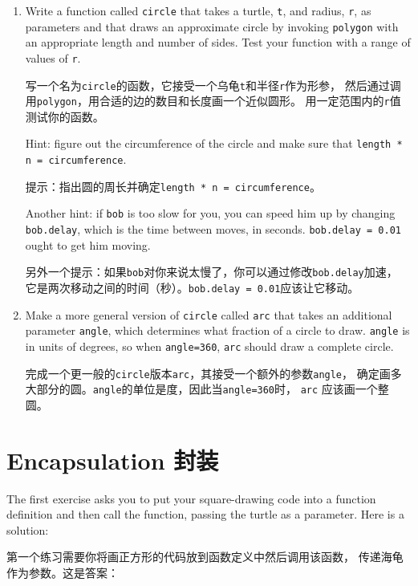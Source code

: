 \documentclass[10pt]{book}
\begin{document}
\begin{CJK}{UTF8}{gbsn}
\begin{enumerate}
\item Write a function called {\tt circle} that takes a turtle, {\tt t},
and radius, {\tt r}, as parameters and that draws an approximate circle
by invoking {\tt polygon} with an appropriate length and number of
sides.  Test your function with a range of values of {\tt r}.

写一个名为{\tt circle}的函数，它接受一个乌龟{\tt t}和半径{\tt r}作为形参，
然后通过调用{\tt polygon}，用合适的边的数目和长度画一个近似圆形。
用一定范围内的{\tt r}值测试你的函数。

Hint: figure out the circumference of the circle and make sure that
{\tt length * n = circumference}.

提示：指出圆的周长并确定{\tt length * n = circumference}。

Another hint: if {\tt bob} is too slow for you, you can speed
him up by changing {\tt bob.delay}, which is the time between moves,
in seconds.  {\tt bob.delay = 0.01} ought to get him moving.

另外一个提示：如果{\tt bob}对你来说太慢了，你可以通过修改{\tt bob.delay}加速，
它是两次移动之间的时间（秒）。{\tt bob.delay = 0.01}应该让它移动。


\item Make a more general version of {\tt circle} called {\tt arc}
that takes an additional parameter {\tt angle}, which determines
what fraction of a circle to draw.  {\tt angle} is in units of
degrees, so when {\tt angle=360}, {\tt arc} should draw a complete
circle.

完成一个更一般的{\tt circle}版本{\tt arc}，其接受一个额外的参数{\tt angle}，
确定画多大部分的圆。{\tt angle}的单位是度，因此当{\tt angle=360}时，
{\tt arc} 应该画一个整圆。

\end{enumerate}

\section{Encapsulation 封装}

The first exercise asks you to put your square-drawing code
into a function definition and then call the function, passing
the turtle as a parameter.  Here is a solution:

第一个练习需要你将画正方形的代码放到函数定义中然后调用该函数，
传递海龟作为参数。这是答案：


\end{CJK}
\end{document}
